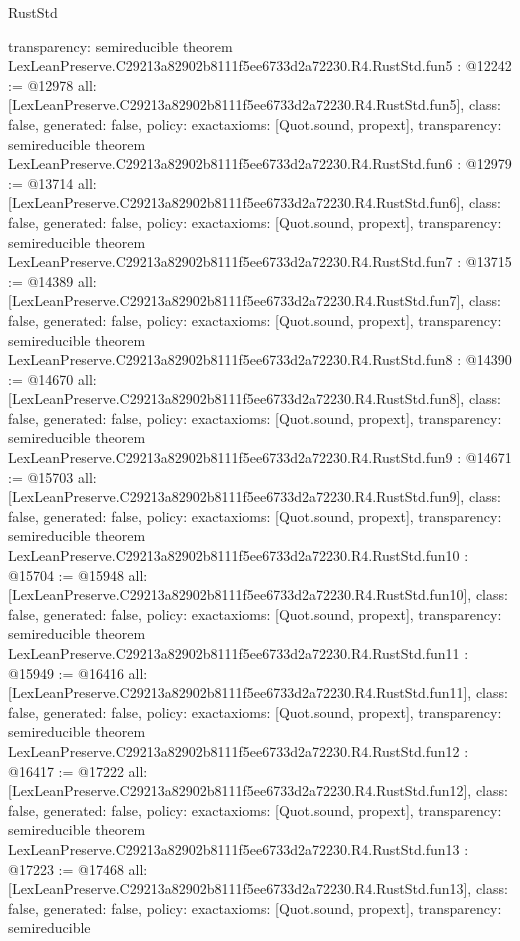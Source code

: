 \begin{lexlean}{RustStd}
\begin{coremodule}
{  transparency: semireducible
}
theorem LexLeanPreserve.C29213a82902b8111f5ee6733d2a72230.R4.RustStd.fun5 : @12242 := @12978 {
  all: [LexLeanPreserve.C29213a82902b8111f5ee6733d2a72230.R4.RustStd.fun5],
  class: false,
  generated: false,
  policy: exact{axioms: [Quot.sound, propext]},
  transparency: semireducible
}
theorem LexLeanPreserve.C29213a82902b8111f5ee6733d2a72230.R4.RustStd.fun6 : @12979 := @13714 {
  all: [LexLeanPreserve.C29213a82902b8111f5ee6733d2a72230.R4.RustStd.fun6],
  class: false,
  generated: false,
  policy: exact{axioms: [Quot.sound, propext]},
  transparency: semireducible
}
theorem LexLeanPreserve.C29213a82902b8111f5ee6733d2a72230.R4.RustStd.fun7 : @13715 := @14389 {
  all: [LexLeanPreserve.C29213a82902b8111f5ee6733d2a72230.R4.RustStd.fun7],
  class: false,
  generated: false,
  policy: exact{axioms: [Quot.sound, propext]},
  transparency: semireducible
}
theorem LexLeanPreserve.C29213a82902b8111f5ee6733d2a72230.R4.RustStd.fun8 : @14390 := @14670 {
  all: [LexLeanPreserve.C29213a82902b8111f5ee6733d2a72230.R4.RustStd.fun8],
  class: false,
  generated: false,
  policy: exact{axioms: [Quot.sound, propext]},
  transparency: semireducible
}
theorem LexLeanPreserve.C29213a82902b8111f5ee6733d2a72230.R4.RustStd.fun9 : @14671 := @15703 {
  all: [LexLeanPreserve.C29213a82902b8111f5ee6733d2a72230.R4.RustStd.fun9],
  class: false,
  generated: false,
  policy: exact{axioms: [Quot.sound, propext]},
  transparency: semireducible
}
theorem LexLeanPreserve.C29213a82902b8111f5ee6733d2a72230.R4.RustStd.fun10 : @15704 := @15948 {
  all: [LexLeanPreserve.C29213a82902b8111f5ee6733d2a72230.R4.RustStd.fun10],
  class: false,
  generated: false,
  policy: exact{axioms: [Quot.sound, propext]},
  transparency: semireducible
}
theorem LexLeanPreserve.C29213a82902b8111f5ee6733d2a72230.R4.RustStd.fun11 : @15949 := @16416 {
  all: [LexLeanPreserve.C29213a82902b8111f5ee6733d2a72230.R4.RustStd.fun11],
  class: false,
  generated: false,
  policy: exact{axioms: [Quot.sound, propext]},
  transparency: semireducible
}
theorem LexLeanPreserve.C29213a82902b8111f5ee6733d2a72230.R4.RustStd.fun12 : @16417 := @17222 {
  all: [LexLeanPreserve.C29213a82902b8111f5ee6733d2a72230.R4.RustStd.fun12],
  class: false,
  generated: false,
  policy: exact{axioms: [Quot.sound, propext]},
  transparency: semireducible
}
theorem LexLeanPreserve.C29213a82902b8111f5ee6733d2a72230.R4.RustStd.fun13 : @17223 := @17468 {
  all: [LexLeanPreserve.C29213a82902b8111f5ee6733d2a72230.R4.RustStd.fun13],
  class: false,
  generated: false,
  policy: exact{axioms: [Quot.sound, propext]},
  transparency: semireducible
}
\end{coremodule}
\end{lexlean}
